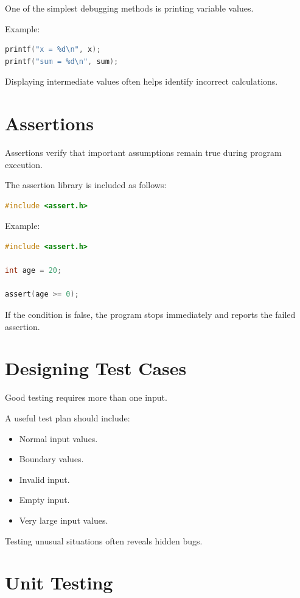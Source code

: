 \documentclass[12pt,openany]{book}
\begin{document}
One of the simplest debugging methods is printing variable values.

Example:

\begin{lstlisting}[language=C]
printf("x = %d\n", x);
printf("sum = %d\n", sum);
\end{lstlisting}

Displaying intermediate values often helps identify incorrect calculations.

\section{Assertions}

Assertions verify that important assumptions remain true during program execution.

The assertion library is included as follows:

\begin{lstlisting}[language=C]
#include <assert.h>
\end{lstlisting}

Example:

\begin{lstlisting}[language=C]
#include <assert.h>

int age = 20;

assert(age >= 0);
\end{lstlisting}

If the condition is false, the program stops immediately and reports the failed assertion.

\section{Designing Test Cases}

Good testing requires more than one input.

A useful test plan should include:

\begin{itemize}
    \item Normal input values.
    \item Boundary values.
    \item Invalid input.
    \item Empty input.
    \item Very large input values.
\end{itemize}

Testing unusual situations often reveals hidden bugs.

\section{Unit Testing}
\end{document}
